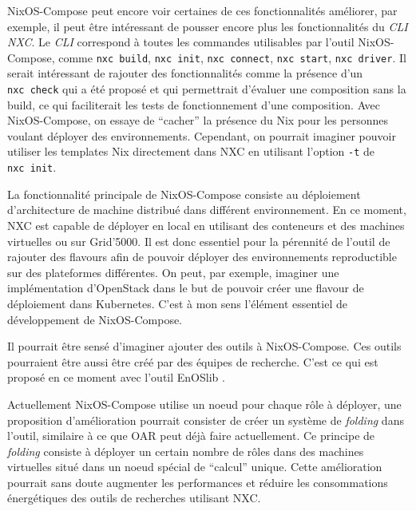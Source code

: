 \documentclass[a4paper,french,12pt, titlepage]{article}
\begin{document}
NixOS-Compose peut encore voir certaines de ces fonctionnalités
améliorer, par exemple, il peut être intéressant de pousser encore plus
les fonctionnalités du \emph{CLI NXC}. Le \emph{CLI} correspond à toutes
les commandes utilisables par l'outil NixOS-Compose, comme
\texttt{nxc\ build}, \texttt{nxc\ init}, \texttt{nxc\ connect},
\texttt{nxc\ start}, \texttt{nxc\ driver}. Il serait intéressant de
rajouter des fonctionnalités comme la présence d'un \texttt{nxc\ check}
qui a été proposé et qui permettrait d'évaluer une composition sans la
build, ce qui faciliterait les tests de fonctionnement d'une
composition. Avec NixOS-Compose, on essaye de ``cacher'' la présence du
Nix pour les personnes voulant déployer des environnements. Cependant,
on pourrait imaginer pouvoir utiliser les templates Nix directement dans
NXC en utilisant l'option \texttt{-t} de \texttt{nxc\ init}.\newline

La fonctionnalité principale de NixOS-Compose consiste au déploiement
d'architecture de machine distribué dans différent environnement. En ce
moment, NXC est capable de déployer en local en utilisant des conteneurs
et des machines virtuelles ou sur Grid'5000. Il est donc essentiel pour
la pérennité de l'outil de rajouter des flavours afin de pouvoir
déployer des environnements reproductible sur des plateformes
différentes. On peut, par exemple, imaginer une implémentation
d'OpenStack dans le but de pouvoir créer une flavour de déploiement dans
Kubernetes. C'est à mon sens l'élément essentiel de développement de
NixOS-Compose.\newline

Il pourrait être sensé d'imaginer ajouter des outils à NixOS-Compose.
Ces outils pourraient être aussi être créé par des équipes de recherche.
C'est ce qui est proposé en ce moment avec l'outil EnOSlib
\cite{enoslib2021}.\newline

Actuellement NixOS-Compose utilise un noeud pour chaque rôle à déployer,
une proposition d'amélioration pourrait consister de créer un système de
\emph{folding} \cite{folding2023} dans l'outil, similaire à ce que OAR
peut déjà faire actuellement. Ce principe de \emph{folding} consiste à
déployer un certain nombre de rôles dans des machines virtuelles situé
dans un noeud spécial de ``calcul'' unique. Cette amélioration pourrait
sans doute augmenter les performances et réduire les consommations
énergétiques des outils de recherches utilisant NXC.\newline
\end{document}
